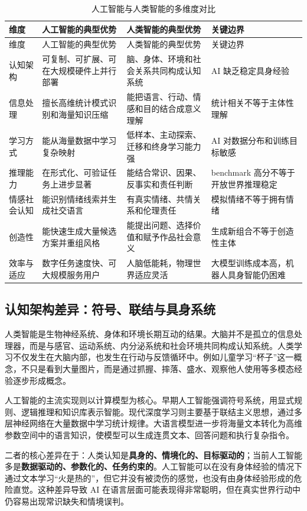 \documentclass[UTF8,zihao=-4,a4paper]{ctexart}
\begin{document}
\begin{longtable}{p{2.6cm}p{4.0cm}p{4.0cm}p{3.2cm}}
\caption{人工智能与人类智能的多维度对比}
\label{tab:ai_human_compare}\\
\toprule
维度 & 人工智能的典型优势 & 人类智能的典型优势 & 关键边界 \\
\midrule
\endfirsthead
\toprule
维度 & 人工智能的典型优势 & 人类智能的典型优势 & 关键边界 \\
\midrule
\endhead
认知架构 & 可复制、可扩展、可在大规模硬件上并行部署 & 脑、身体、环境和社会关系共同构成认知系统 & AI 缺乏稳定具身经验 \\
信息处理 & 擅长高维统计模式识别和海量知识压缩 & 能把语言、行动、情感和目的结合成意义理解 & 统计相关不等于主体性理解 \\
学习方式 & 能从海量数据中学习复杂映射 & 低样本、主动探索、迁移和终身学习能力强 & AI 对数据分布和训练目标敏感 \\
推理能力 & 在形式化、可验证任务上进步显著 & 能结合常识、因果、反事实和责任判断 & benchmark 高分不等于开放世界推理稳定 \\
情感社会认知 & 能识别情绪线索并生成社交语言 & 有真实情绪、共情关系和伦理责任 & 模拟情绪不等于拥有情绪 \\
创造性 & 能快速生成大量候选方案并重组风格 & 能提出问题、选择价值和赋予作品社会意义 & 生成新组合不等于创造性主体 \\
效率与适应 & 数字任务速度快、可大规模服务用户 & 人脑低能耗，物理世界适应灵活 & 大模型训练成本高，机器人具身智能仍困难 \\
\bottomrule
\end{longtable}

\subsection{认知架构差异：符号、联结与具身系统}

人类智能是生物神经系统、身体和环境长期互动的结果。大脑并不是孤立的信息处理器，而是与感官、运动系统、内分泌系统和社会环境共同构成认知系统。人类学习不仅发生在大脑内部，也发生在行动与反馈循环中。例如儿童学习“杯子”这一概念，不只是看到大量图片，而是通过抓握、摔落、盛水、观察他人使用等多模态经验逐步形成概念。

人工智能的主流实现则以计算模型为核心。早期人工智能强调符号系统，用显式规则、逻辑推理和知识库表示智能。现代深度学习则主要基于联结主义思想，通过多层神经网络在大量数据中学习统计规律。大语言模型进一步将海量文本转化为高维参数空间中的语言知识，使模型可以生成连贯文本、回答问题和执行复杂指令。

二者的核心差异在于：人类认知是\textbf{具身的、情境化的、目标驱动的}；当前人工智能多是\textbf{数据驱动的、参数化的、任务约束的}。人工智能可以在没有身体经验的情况下通过文本学习“火是热的”，但它并没有被烫伤的感觉，也没有由身体经验形成的危险直觉。这种差异导致 AI 在语言层面可能表现得非常聪明，但在真实世界行动中仍容易出现常识缺失和情境误判。
\end{document}
